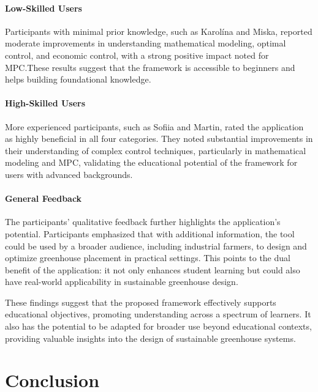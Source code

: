 \documentclass[conference]{IEEEtran}
\begin{document}
\paragraph{Low-Skilled Users}
Participants with minimal prior knowledge,
such as Karolína and Miska, reported moderate improvements in understanding mathematical modeling, optimal control, and economic control, with a strong positive impact noted for MPC.\@ These results suggest that the framework is accessible to beginners and helps building foundational knowledge.

\paragraph{High-Skilled Users}
More experienced participants, such as Sofiia and Martin, rated the application as highly beneficial in all four categories. They noted substantial improvements in their understanding of complex control techniques, particularly in mathematical modeling and MPC, validating the educational potential of the framework for users with advanced backgrounds.

\paragraph{General Feedback}
The participants' qualitative feedback further highlights the application's potential. Participants emphasized that with additional information, the tool could be used by a broader audience, including industrial farmers, to design and optimize greenhouse placement in practical settings. This points to the dual benefit of the application: it not only enhances student learning but could also have real-world applicability in sustainable greenhouse design.

These findings suggest that the proposed framework effectively supports educational objectives, promoting understanding across a spectrum of learners. It also has the potential to be adapted for broader use beyond educational contexts, providing valuable insights into the design of sustainable greenhouse systems.

\section{Conclusion}



\end{document}

